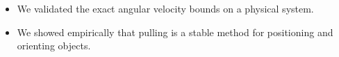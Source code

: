 \documentclass[potrait,paperwidth=20in,paperheight=30in,margin=1.5in,fontscale = 0.5]{baposter} %
\begin{document}
\begin{poster}
{  \begin{itemize}
  \item We validated the exact angular velocity bounds on a physical system.
  \item We showed empirically that pulling is a stable method for
    positioning and orienting objects.
  \end{itemize}
}
\end{poster}
\end{document}
